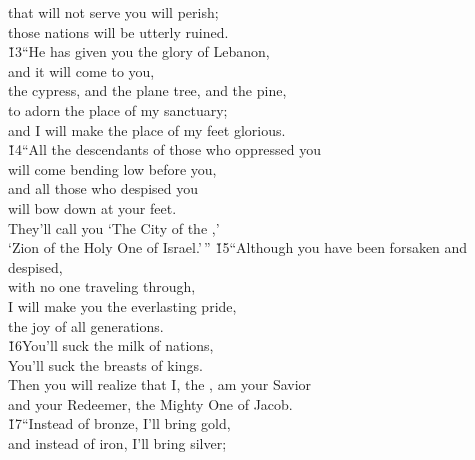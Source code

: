 \begin{poetry}
\poemll    that will not serve you will perish; \\
\poemlll       those nations will be utterly ruined. \\
\poeml \v{13}``He has given you the glory of Lebanon, \\
\poemll    and it will come to you, \\
\poemlll       the cypress, and the plane tree, and the pine, \\
\poeml to adorn the place of my sanctuary; \\
\poemll    and I will make the place of my feet glorious. \\
\poeml \v{14}``All the descendants of those who oppressed you \\
\poemll    will come bending low before you, \\
\poeml and all those who despised you \\
\poemll    will bow down at your feet. \\
\poeml They'll call you `The City of the ,' \\
\poemll    `Zion of the Holy One of Israel.'\,''
\poeml \v{15}``Although you have been forsaken and despised, \\
\poemll    with no one traveling through, \\
\poeml I will make you the everlasting pride, \\
\poemll    the joy of all generations. \\
\poeml \v{16}You'll suck the milk of nations, \\
\poemll    You'll suck the breasts of kings. \\
\poeml Then you will realize that I, the , am your Savior \\
\poemll    and your Redeemer, the Mighty One of Jacob. \\
\poeml \v{17}``Instead of bronze, I'll bring gold, \\
\poemll    and instead of iron, I'll bring silver; \\

\end{poetry}
